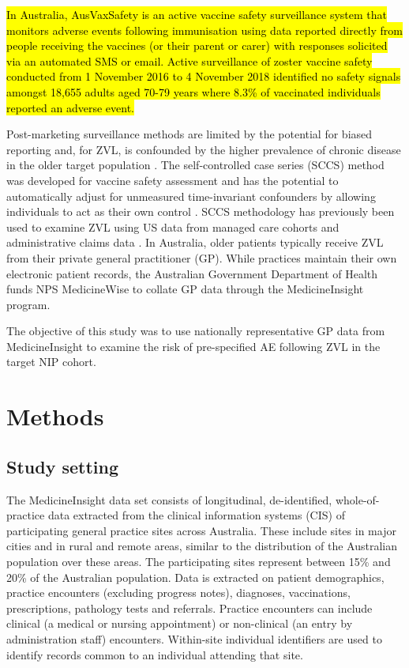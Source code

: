 \documentclass[review, endfloat]{elsarticle}
\begin{document}
\hl{In Australia, AusVaxSafety is an active vaccine safety surveillance system that monitors adverse events following immunisation using data reported directly from people receiving the vaccines (or their parent or carer) with responses solicited via an automated SMS or email. Active surveillance of zoster vaccine safety conducted from 1 November 2016 to 4 November 2018 identified no safety signals amongst 18,655 adults aged 70-79 years where 8.3\% of vaccinated individuals reported an adverse event.}\citep{ausvaxsafety}

Post-marketing surveillance methods are limited by the potential for biased reporting and, for ZVL, is confounded by the higher prevalence of chronic disease in the older target population \citep{miller2018post}. The self-controlled case series (SCCS) method was developed for vaccine safety assessment and has the potential to automatically adjust for unmeasured time-invariant confounders by allowing individuals to act as their own control \citep{petersen2016}. SCCS methodology has previously been used to examine ZVL using US data from managed care cohorts \citep{tseng2012} and administrative claims data \citep{minassian2015}. In Australia, older patients typically receive ZVL from their private general practitioner (GP). While practices maintain their own electronic patient records, the Australian Government Department of Health funds NPS MedicineWise to collate GP data through the MedicineInsight program. 

The objective of this study was to use nationally representative GP data from MedicineInsight to examine the risk of pre-specified AE following ZVL in the target NIP cohort.

\section{Methods}

\subsection{Study setting}

The MedicineInsight data set consists of longitudinal, de-identified, whole-of-practice data extracted from the clinical information systems (CIS) of participating general practice sites across Australia. These include sites in major cities and in rural and remote areas, similar to the distribution of the Australian population over these areas. The participating sites represent between 15\% and 20\% of the Australian population.  Data is extracted on patient demographics, practice encounters (excluding progress notes), diagnoses, vaccinations, prescriptions, pathology tests and referrals. Practice encounters can include clinical (a medical or nursing appointment) or non-clinical (an entry by administration staff) encounters. Within-site individual identifiers are used to identify records common to an individual attending that site. 
\end{document}

